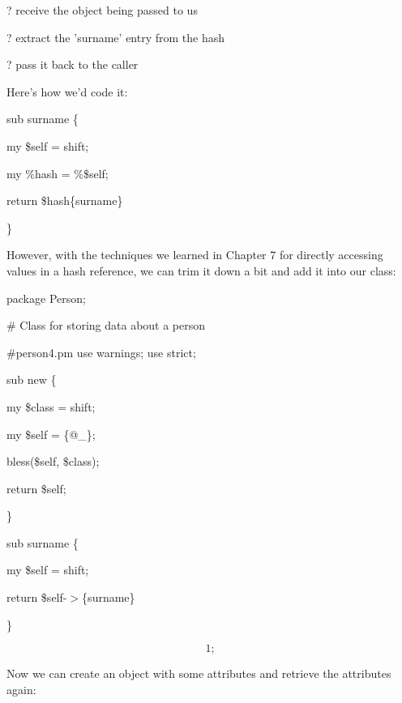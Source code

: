 \documentclass[a4paper,11pt]{book}
\begin{document}
\noindent 

\noindent ? receive the object being passed to us

\noindent 

\noindent ? extract the 'surname' entry from the hash

\noindent 

\noindent ? pass it back to the caller

\noindent 

\noindent Here's how we'd code it:

\noindent 

\noindent 

\noindent sub surname \{

\noindent my \$self = shift;

\noindent my \%hash = \%\$self;

\noindent return \$hash\{surname\}

\noindent \}

\noindent 

\noindent However, with the techniques we learned in Chapter 7 for directly accessing values in a hash reference, we can trim it down a bit and add it into our class:

\noindent 

\noindent package Person;

\noindent \# Class for storing data about a person

\noindent \#person4.pm use warnings; use strict;

\noindent 

\noindent 

\noindent sub new \{

\noindent my \$class = shift;

\noindent my \$self = \{@\_\};

\noindent bless(\$self, \$class);

\noindent return \$self;

\noindent \}

\noindent 

\noindent sub surname \{

\noindent my \$self = shift;

\noindent return \$self-$>$\{surname\}

\noindent \}

\noindent 

\[1;\] 


\noindent Now we can create an object with some attributes and retrieve the attributes again:
\end{document}
